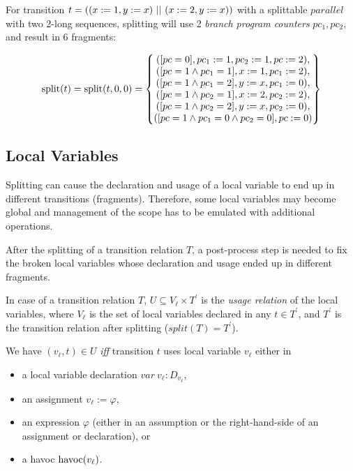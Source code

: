 \begin{example}  For transition $t = ((x := 1, y := x)\textup{ || }(x := 2, y := x))$ with a splittable $parallel$ with two 2-long sequences, splitting will use 2 \textit{branch program counters} $pc_1, pc_2$, and result in 6 fragments:

\begin{align*}
\mathrm{split}(t) = \mathrm{split}(t,0,0) = \begin{Bmatrix}
([pc = 0], pc_1 := 1, pc_2 := 1, pc := 2), \\
([pc = 1 \land pc_1 = 1], x := 1, pc_1 := 2), \\
([pc = 1 \land pc_1 = 2], y := x, pc_1 := 0), \\
([pc = 1 \land pc_2 = 1], x := 2, pc_2 := 2), \\
([pc = 1 \land pc_2 = 2], y := x, pc_2 := 0), \\
([pc = 1 \land pc_1 = 0 \land pc_2 = 0], pc := 0)
\end{Bmatrix}
\end{align*}
\end{example}

\subsection{Local Variables}
Splitting can cause the declaration and usage of a local variable to end up in different transitions (fragments). Therefore, some local variables may become global and management of the scope has to be emulated with additional operations.

After the splitting of a transition relation $T$, a post-process step is needed to fix the broken local variables whose declaration and usage ended up in different fragments.

\begin{definition}
    In case of a transition relation $T$, $U \subseteq V_\ell \times T^\prime$ is the \emph{usage relation} of the local variables, where $V_\ell$ is the set of local variables declared in any $t \in T^\prime$, and $T^\prime$ is the transition relation after splitting ($split(T) = T^\prime$).
\end{definition}

We have $(v_\ell, t) \in U$ \emph{iff} transition $t$ uses local variable $v_\ell$ either in
\begin{itemize}
    \item a local variable declaration $var\ v_\ell : D_{v_\ell}$,
    \item an assignment $v_\ell := \varphi$,
    \item an expression $\varphi$ (either in an assumption or the right-hand-side of an assignment or declaration), or
    \item a havoc $\mathrm{havoc}(v_\ell)$.
\end{itemize}

